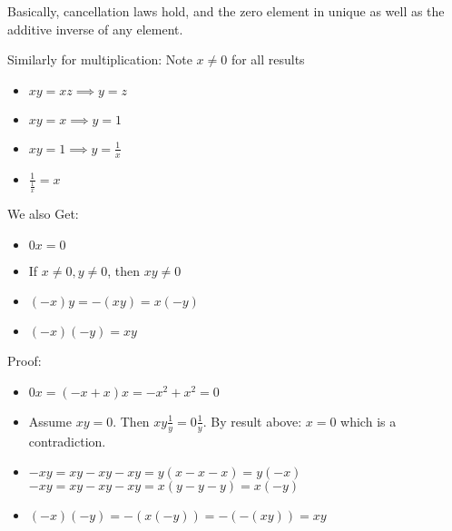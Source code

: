 \documentclass[12pt, letterpaper]{paper}
\begin{document}
Basically, cancellation laws hold, and the zero element in unique as
well as the additive inverse of any element.

Similarly for multiplication: Note $x\neq0$ for all results
\begin{itemize}
\item $xy = xz \implies y = z$
\item $xy = x \implies y = 1$
\item $xy = 1 \implies y = \frac{1}{x}$
\item $\frac{1}{\frac{1}{x}} = x$
\end{itemize}

\vspace{ .33in }

We also Get:
\begin{itemize}
\item $0x = 0$
\item If $x \neq0, y\neq0$, then $xy \neq 0$
\item $(-x)y = -(xy) = x(-y)$
\item $(-x)(-y) = xy$
\end{itemize}

Proof:
\begin{itemize}
\item $0x = (-x + x )x = -x^2 + x^2 = 0$
\item Assume $xy =0$. Then $xy \frac{1}{y} = 0 \frac{1}{y}$. By result
  above: $x = 0$ which is a contradiction.
\item $-xy = xy - xy - xy = y( x -x -x ) = y( -x )$ \newline
  $-xy = xy - xy - xy = x( y - y -y ) = x(-y)$
\item $(-x)(-y) = -(x(-y)) = -( - (xy ) ) = xy$
\end{itemize}
\end{document}
